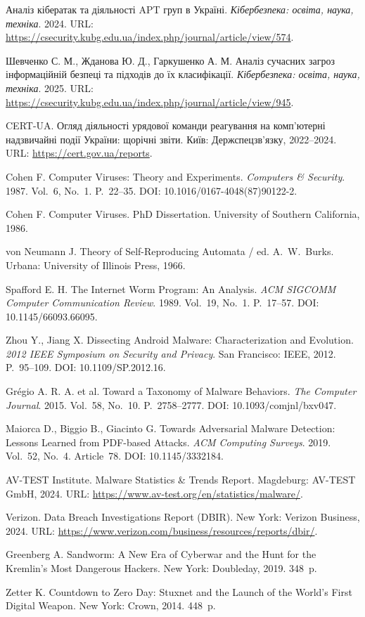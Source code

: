 
 Аналіз кібератак та діяльності APT груп в Україні. \emph{Кібербезпека: освіта, наука, техніка}. 2024. URL: \url{https://csecurity.kubg.edu.ua/index.php/journal/article/view/574}.

 Шевченко С. М., Жданова Ю. Д., Гаркушенко А. М. Аналіз сучасних загроз інформаційній безпеці та підходів до їх класифікації. \emph{Кібербезпека: освіта, наука, техніка}. 2025. URL: \url{https://csecurity.kubg.edu.ua/index.php/journal/article/view/945}.

 CERT-UA. Огляд діяльності урядової команди реагування на комп'ютерні надзвичайні події України: щорічні звіти. Київ: Держспецзв'язку, 2022--2024. URL: \url{https://cert.gov.ua/reports}.

 Cohen F. Computer Viruses: Theory and Experiments. \emph{Computers \& Security}. 1987. Vol.~6, No.~1. P.~22--35. DOI: 10.1016/0167-4048(87)90122-2.

 Cohen F. Computer Viruses. PhD Dissertation. University of Southern California, 1986.

 von Neumann J. Theory of Self-Reproducing Automata / ed. A.~W.~Burks. Urbana: University of Illinois Press, 1966.

 Spafford E. H. The Internet Worm Program: An Analysis. \emph{ACM SIGCOMM Computer Communication Review}. 1989. Vol.~19, No.~1. P.~17--57. DOI: 10.1145/66093.66095.

 Zhou Y., Jiang X. Dissecting Android Malware: Characterization and Evolution. \emph{2012 IEEE Symposium on Security and Privacy}. San Francisco: IEEE, 2012. P.~95--109. DOI: 10.1109/SP.2012.16.

 Grégio A. R. A. et al. Toward a Taxonomy of Malware Behaviors. \emph{The Computer Journal}. 2015. Vol.~58, No.~10. P.~2758--2777. DOI: 10.1093/comjnl/bxv047.

 Maiorca D., Biggio B., Giacinto G. Towards Adversarial Malware Detection: Lessons Learned from PDF-based Attacks. \emph{ACM Computing Surveys}. 2019. Vol.~52, No.~4. Article~78. DOI: 10.1145/3332184.

 AV-TEST Institute. Malware Statistics \& Trends Report. Magdeburg: AV-TEST GmbH, 2024. URL: \url{https://www.av-test.org/en/statistics/malware/}.

 Verizon. Data Breach Investigations Report (DBIR). New York: Verizon Business, 2024. URL: \url{https://www.verizon.com/business/resources/reports/dbir/}.

 Greenberg A. Sandworm: A New Era of Cyberwar and the Hunt for the Kremlin's Most Dangerous Hackers. New York: Doubleday, 2019. 348~p.

 Zetter K. Countdown to Zero Day: Stuxnet and the Launch of the World's First Digital Weapon. New York: Crown, 2014. 448~p.
